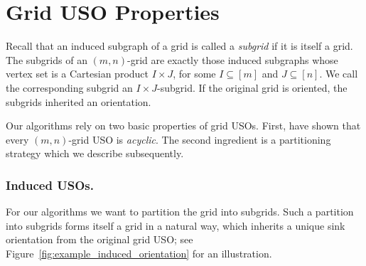 \documentclass[runningheads,a4paper]{llncs}
\newcommand{\JN}[1]{\marginpar{\parbox{3.6cm}{{\small {\bf JN:} #1}}}} %
\begin{document}


\section{Grid USO Properties}\label{section:grid_uso_properties}




Recall that an induced subgraph of a grid is called a \emph{subgrid} if it is itself a grid.
The subgrids of an $(m,n)$-grid are exactly those induced subgraphs whose vertex set is a
Cartesian product $I \times J$, for some $I \subseteq [m]$ and $J \subseteq [n]$. We call the corresponding subgrid an $I\times J$-subgrid.
If the original grid is oriented, the subgrids inherited an orientation. 

Our algorithms rely on two basic properties of grid USOs.
First, \citet{grid08} have shown that every $(m,n)$-grid USO is \emph{acyclic}. 
The second ingredient is a partitioning strategy which we describe subsequently.

\vspace{-.2in}\subsubsection{Induced USOs.}

For our algorithms we want to partition the grid into subgrids.
Such a partition into subgrids forms itself a grid in a natural way,
which inherits a unique sink orientation from the original grid USO; see Figure~\ref{fig:example_induced_orientation} for an illustration.
\end{document}
